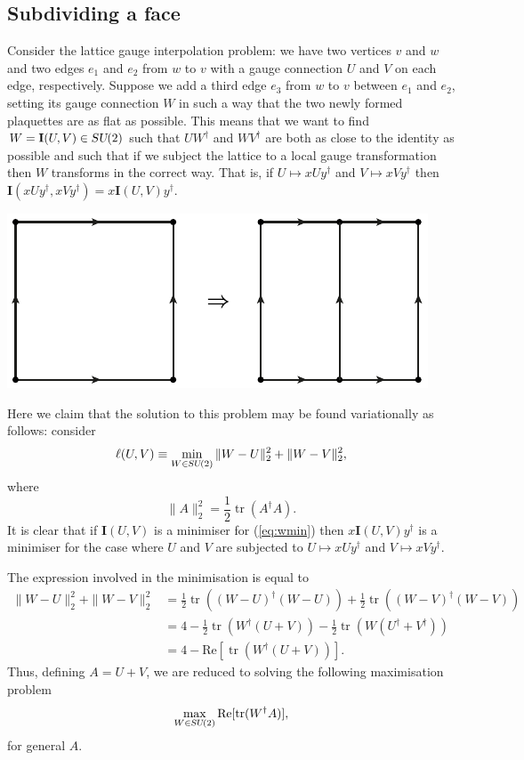 \documentclass[12pt]{amsart}
\newcommand{\tr}{\operatorname{tr}}
\def\su2{\textsl{SU}(2)}
\theoremstyle{definition}
\theoremstyle{remark}
\numberwithin{equation}{section}
\begin{document}
\subsection{Subdividing a face}\label{subsec:facesubd}
Consider the lattice gauge interpolation problem: we have two vertices $v$ and $w$ and two edges $e_1$ and $e_2$ from $w$ to $v$ with a gauge connection $U$ and $V$ on each edge, respectively. Suppose we add a third edge $e_3$ from $w$ to $v$ between $e_1$ and $e_2$, setting its gauge connection $W$ in such a way that the two newly formed plaquettes are as flat as possible. This means that we want to find $W = \mathbf{I}(U,V)\in \su2$ such that $UW^\dag$ and $WV^\dag$ are both as close to the identity as possible and such that if we subject the lattice to a local gauge transformation then $W$ transforms in the correct way. That is, if $U\mapsto xUy^\dag$ and $V\mapsto xVy^\dag$ then $\mathbf{I}(xUy^\dag,xVy^\dag)= x\mathbf{I}(U,V)y^\dag$.
\begin{center}
	\includegraphics{facesubdivision.pdf}
\end{center}

Here we claim that the solution to this problem may be found variationally as follows: consider
\begin{equation}\label{eq:wmin}
	\ell(U,V) \equiv \min_{W\in \su2} \|W-U\|_2^2 + \|W-V\|_2^2,
\end{equation}
where
\begin{equation}
	\|A\|_2^2 = \frac{1}{2}\tr(A^\dag A).
\end{equation}
It is clear that if $\mathbf{I}(U,V)$ is a minimiser for (\ref{eq:wmin}) then $x\mathbf{I}(U,V)y^\dag$ is a minimiser for the case where $U$ and $V$ are subjected to $U\mapsto xUy^\dag$ and $V\mapsto xVy^\dag$.


The expression involved in the minimisation is equal to
\begin{equation}
	\begin{split}
		\|W-U\|_2^2 + \|W-V\|_2^2 &= \frac12 \tr( (W-U)^\dag (W-U) ) + \frac12 \tr((W-V)^\dag (W-V)) \\
		&= 4 - \frac12\tr(W^\dag(U+V)) - \frac12\tr(W(U^\dag+V^\dag)) \\ 
		&= 4-\text{Re}[\tr(W^\dag(U+V))].
	\end{split}
\end{equation}
Thus, defining $A = U+V$, we are reduced to solving the following maximisation problem
\begin{equation}
	\max_{W\in \su2} \text{Re}[\tr(W^\dag A)],
\end{equation}
for general $A$.
\end{document}
